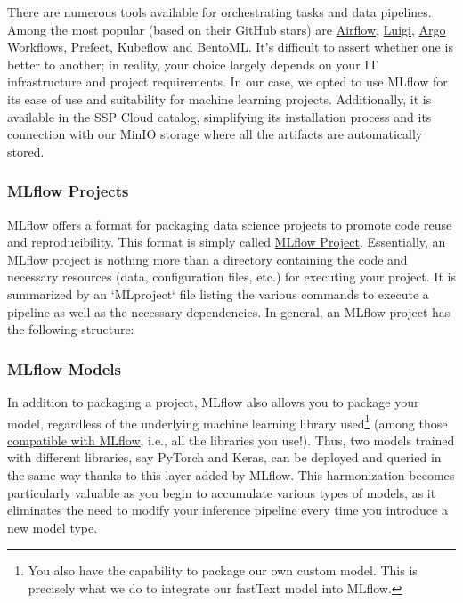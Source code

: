 There are numerous tools available for orchestrating tasks and data pipelines. Among the most popular (based on their GitHub stars) are \href{https://github.com/apache/airflow}{Airflow}, \href{https://github.com/spotify/luigi}{Luigi}, \href{https://github.com/argoproj/argo-workflows}{Argo Workflows}, \href{https://github.com/PrefectHQ/prefect}{Prefect}, \href{https://github.com/kubeflow/kubeflow}{Kubeflow} and \href{https://github.com/bentoml/BentoML}{BentoML}. It's difficult to assert whether one is better to another; in reality, your choice largely depends on your IT infrastructure and project requirements. In our case, we opted to use MLflow for its ease of use and suitability for machine learning projects. Additionally, it is available in the SSP Cloud catalog, simplifying its installation process and its connection with our MinIO storage where all the artifacts are automatically stored.

\subsubsection{MLflow Projects}

MLflow offers a format for packaging data science projects to promote code reuse and reproducibility. This format is simply called \href{https://MLflow.org/docs/latest/projects.html}{MLflow Project}. Essentially, an MLflow project is nothing more than a directory containing the code and necessary resources (data, configuration files, etc.) for executing your project. It is summarized by an `MLproject` file listing the various commands to execute a pipeline as well as the necessary dependencies. In general, an MLflow project has the following structure:



\subsubsection{MLflow Models}

In addition to packaging a project, MLflow also allows you to package your model, regardless of the underlying machine learning library used\footnote{You also have the capability to package our own custom model. This is precisely what we do to integrate our fastText model into MLflow.}  (among those \href{https://MLflow.org/docs/latest/models.html#built-in-model-flavors}{compatible with MLflow}, i.e., all the libraries you use!). Thus, two models trained with different libraries, say PyTorch and Keras, can be deployed and queried in the same way thanks to this layer added by MLflow. This harmonization becomes particularly valuable as you begin to accumulate various types of models, as it eliminates the need to modify your inference pipeline every time you introduce a new model type.


